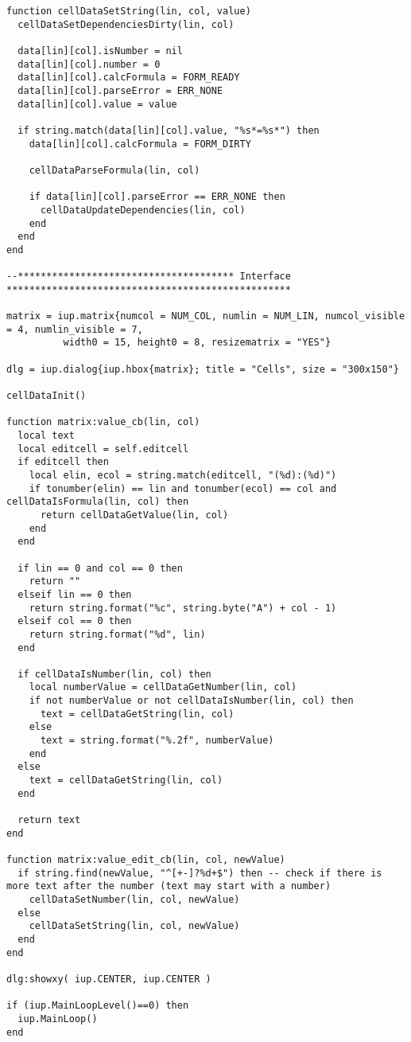 \documentclass{ctexart}
\begin{document}
\begin{lstlisting}
function cellDataSetString(lin, col, value)
  cellDataSetDependenciesDirty(lin, col)
  
  data[lin][col].isNumber = nil
  data[lin][col].number = 0
  data[lin][col].calcFormula = FORM_READY
  data[lin][col].parseError = ERR_NONE
  data[lin][col].value = value
  
  if string.match(data[lin][col].value, "%s*=%s*") then
    data[lin][col].calcFormula = FORM_DIRTY
    
    cellDataParseFormula(lin, col)
    
    if data[lin][col].parseError == ERR_NONE then
      cellDataUpdateDependencies(lin, col)
    end
  end
end

--************************************** Interface **************************************************

matrix = iup.matrix{numcol = NUM_COL, numlin = NUM_LIN, numcol_visible = 4, numlin_visible = 7,
          width0 = 15, height0 = 8, resizematrix = "YES"}

dlg = iup.dialog{iup.hbox{matrix}; title = "Cells", size = "300x150"}

cellDataInit()

function matrix:value_cb(lin, col)
  local text
  local editcell = self.editcell
  if editcell then
    local elin, ecol = string.match(editcell, "(%d):(%d)")
    if tonumber(elin) == lin and tonumber(ecol) == col and cellDataIsFormula(lin, col) then
      return cellDataGetValue(lin, col)
    end
  end

  if lin == 0 and col == 0 then
    return ""
  elseif lin == 0 then
    return string.format("%c", string.byte("A") + col - 1)
  elseif col == 0 then
    return string.format("%d", lin)
  end

  if cellDataIsNumber(lin, col) then
    local numberValue = cellDataGetNumber(lin, col)
    if not numberValue or not cellDataIsNumber(lin, col) then 
      text = cellDataGetString(lin, col)
    else
      text = string.format("%.2f", numberValue)
    end
  else
    text = cellDataGetString(lin, col)
  end
  
  return text
end

function matrix:value_edit_cb(lin, col, newValue)
  if string.find(newValue, "^[+-]?%d+$") then -- check if there is more text after the number (text may start with a number)
    cellDataSetNumber(lin, col, newValue)
  else
    cellDataSetString(lin, col, newValue)
  end
end

dlg:showxy( iup.CENTER, iup.CENTER )

if (iup.MainLoopLevel()==0) then
  iup.MainLoop()
end
\end{lstlisting}
\end{document}
